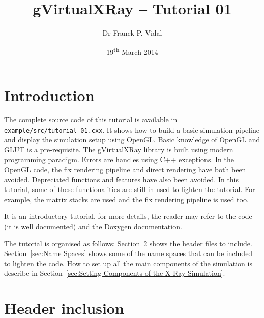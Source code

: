 \documentclass[11pt,oneside,a4paper,final]{article}
\title{gVirtualXRay -- Tutorial 01}
\author{Dr Franck P. Vidal}
\date{19\textsuperscript{th} March 2014}
\begin{document}
 \sloppy

\maketitle

\newpage
{}
{}
\tableofcontents

\newpage
{}
{}
\listoffigures


\newpage
{}
{}
\lstlistoflistings

\newpage

\section{Introduction}

The complete source code of this tutorial is available in \verb+example/src/tutorial_01.cxx+. 
It shows how to build a basic simulation pipeline and display the simulation setup using OpenGL. 
Basic knowledge of OpenGL and \Gls{GLUT} is a pre-requisite. 
The gVirtualXRay library is built using modern programming paradigm. 
Errors are handles using C++ exceptions. 
In the OpenGL code, the fix rendering pipeline and direct rendering have both been avoided. 
Depreciated functions and features have also been avoided. 
In this tutorial, some of these functionalities are still in used to lighten the tutorial. 
For example, the matrix stacks are used and the fix rendering pipeline is used too.

It is an introductory tutorial, for more details, the reader may refer to the code (it is well documented) and the Doxygen documentation. 

The tutorial is organised as follows:
Section~\ref{sec:Header inclusion} shows the header files to include. 
Section~\ref{sec:Name Spaces} shows some of the name spaces that can be included to lighten the code. 
How to set up all the main components of the simulation is describe in Section~\ref{sec:Setting Components of the X-Ray Simulation}.


\section{Header inclusion}
\label{sec:Header inclusion}
\end{document}
